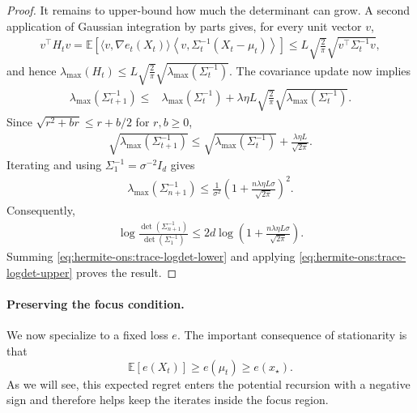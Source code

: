 \documentclass{article}
\theoremstyle{plain}
\theoremstyle{definition}
\theoremstyle{plain}
\newcommand{\E}{\mathbb E}
\begin{document}
\begin{proof}
    It remains to upper-bound how much the determinant can grow.
    A second application of Gaussian integration by parts gives, for
    every unit vector $v$,
    \begin{align}
        v^\top H_tv
        =
        \E\left[
            \langle v,\nabla e_t(X_t)\rangle
            \left\langle
            v,\Sigma_t^{-1}(X_t-\mu_t)
            \right\rangle
            \right]
        \leq
        L\sqrt{\frac{2}{\pi}}
        \sqrt{v^\top\Sigma_t^{-1}v},
    \end{align}
    and hence
    $\lambda_{\max}(H_t)
        \leq
        L\sqrt{\frac{2}{\pi}}
        \sqrt{\lambda_{\max}(\Sigma_t^{-1})}.$
    The covariance update now implies
    \begin{align}
        \lambda_{\max}(\Sigma_{t+1}^{-1})
        \leq{} &
        \lambda_{\max}(\Sigma_t^{-1})
        +
        \lambda\eta L\sqrt{\frac{2}{\pi}}
        \sqrt{\lambda_{\max}(\Sigma_t^{-1})}.
    \end{align}
    Since $\sqrt{r^2+br}\leq r+b/2$ for $r,b\geq0$,
    \begin{align}
        \sqrt{\lambda_{\max}(\Sigma_{t+1}^{-1})}
        \leq
        \sqrt{\lambda_{\max}(\Sigma_t^{-1})}
        +
        \frac{\lambda\eta L}{\sqrt{2\pi}}.
    \end{align}
    Iterating and using $\Sigma_1^{-1}=\sigma^{-2}I_d$ gives
    \begin{align}
        \lambda_{\max}(\Sigma_{n+1}^{-1})
        \leq
        \frac{1}{\sigma^2}
        \left(
        1+\frac{n\lambda\eta L\sigma}{\sqrt{2\pi}}
        \right)^2.
    \end{align}
    Consequently,
    \begin{align}
        \log\frac{\det(\Sigma_{n+1}^{-1})}
        {\det(\Sigma_1^{-1})}
        \leq
        2d\log\left(
        1+\frac{n\lambda\eta L\sigma}{\sqrt{2\pi}}
        \right).
        \label{eq:hermite-ons:trace-logdet-upper}
    \end{align}
    Summing \eqref{eq:hermite-ons:trace-logdet-lower} and applying
    \eqref{eq:hermite-ons:trace-logdet-upper} proves the result.
\end{proof}

\paragraph{Preserving the focus condition.}
We now specialize to a fixed loss $e$. The important consequence of
stationarity is that
\[
    \E[e(X_t)]\geq e(\mu_t)\geq e(x_\star).
\]
As we will see, this expected regret enters the potential recursion with
a negative sign and therefore helps keep the iterates inside the focus
region.
\end{document}
